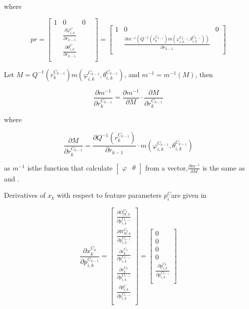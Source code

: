 \noindent where

\begin{equation}
pr=\begin{bmatrix}
1 & 0 & 0 & \\
&\frac{\partial \varphi _{i, k}^{C}}{\partial r_{k-1}} & \\
&\frac{\partial \theta _{i, k}^{C}}{\partial r_{k-1}} & \\
\end{bmatrix}= \begin{bmatrix}
1 & 0 & 0 \\
&\frac{\partial m^{-1}(Q^{-1}(r_{k}^{C_{k-1}})m(\varphi _{i, 
k}^{C_{k-1}}, \theta _{i, k}^{C_{k-1}}))}{\partial r_{k-1}} & \\
\end{bmatrix}
\end{equation}

Let $M=Q^{-1}(r_{k}^{C_{k-1}})m(\varphi_{i, k}^{C_{k-1}}, \theta _{i, 
k}^{C_{k-1}})$, and $m^{-1}=m^{-1}(M)$, then

\begin{equation}
\frac{\partial m^{-1}}{\partial r_{k}^{C_{k-1}}}=
\frac{\partial m^{-1}}{\partial M}\cdot 
\frac{\partial M}{\partial r_{k}^{C_{k-1}}}
\end{equation}

\noindent where

\begin{equation}
\frac{\partial M}{\partial r_{k}^{C_{k-1}}}= 
\frac{\partial Q^{-1}(r_{k}^{C_{k-1}})}{\partial r_{k-1}}
\cdot m(\varphi_{i, k}^{C_{k-1}}, \theta_{i, k}^{C_{k-1}})
\end{equation}


\noindent as $m^{-1}$ isthe function that calculate
$\begin{bmatrix}\varphi & \theta \end{bmatrix}$ from a 
vector,$\frac{\partial m^{-1}}{\partial M}$ is the same as and .

Derivatives of $x_{k}$ with respect to feature parameters $p_{i}^{C}
$are given in

\begin{equation}
\frac{\partial x_{k}^{C_{k}}}{\partial p_{i,k}^{C_{k-1 }}}=
\begin{bmatrix}
\frac{\partial O_{W,k}^{C_{k}}}{\partial p_{i,k}^{C_{k-1 }}} \\
\frac{\partial W_{W,k}^{C_{k}}}{\partial p_{i,k}^{C_{k-1 }}} \\
\frac{\partial c_{k}^{C_{k}}}{\partial p_{i,k}^{C_{k-1 }}} \\
\frac{\partial r_{k}^{C_{k}}}{\partial p_{i,k}^{C_{k-1 }}} \\
\frac{\partial p_{i, k}^{C}}{\partial p_{i,k}^{C_{k-1 }}} \\
\end{bmatrix} = \begin{bmatrix}
0 \\
0 \\
0 \\
0 \\
\frac{\partial p_{i,k}^{C_{k }}}{\partial p_{i,k}^{C_{k-1 }}} \\
\end{bmatrix}
\end{equation}


